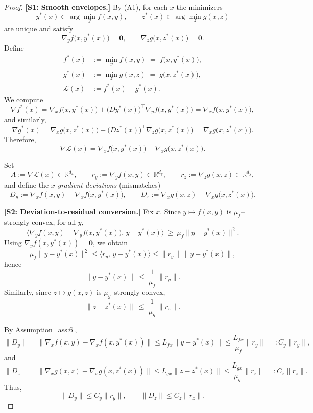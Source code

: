 \documentclass{article}
\newcommand{\1}{\mathbf{1}}
\begin{document}
\begin{proof}
\textbf{[S1: Smooth envelopes.]}
\noindent By \textnormal{(A1)}, for each $x$ the minimizers
\[
y^*(x)\in\arg\min_{y} f(x,y),\qquad z^*(x)\in\arg\min_{z} g(x,z)
\]
are unique and satisfy 
\[
\nabla_y f\bigl(x,y^*(x)\bigr)=\mathbf 0,
\qquad
\nabla_z g\bigl(x,z^*(x)\bigr)=\mathbf 0.
\]
Define
\[
\begin{aligned}
f^*(x) &:= \min_{y} f(x,y) \;=\; f\bigl(x,y^*(x)\bigr),\\
g^*(x) &:= \min_{z} g(x,z) \;=\; g\bigl(x,z^*(x)\bigr),\\
\mathcal L(x) &:= f^*(x) - g^*(x).
\end{aligned}
\]
We compute
\[
\nabla f^*(x)
=\nabla_x f\bigl(x,y^*(x)\bigr)
+\bigl(Dy^*(x)\bigr)^{\top}\nabla_y f\bigl(x,y^*(x)\bigr)
=\nabla_x f\bigl(x,y^*(x)\bigr),
\]
and similarly,
\[
\nabla g^*(x)
=\nabla_x g\bigl(x,z^*(x)\bigr)
+\bigl(Dz^*(x)\bigr)^{\top}\nabla_z g\bigl(x,z^*(x)\bigr)
=\nabla_x g\bigl(x,z^*(x)\bigr).
\]
Therefore,
\begin{equation}\label{eq:L-grad}
\nabla \mathcal L(x)=\nabla_x f\bigl(x,y^*(x)\bigr)-\nabla_x g\bigl(x,z^*(x)\bigr).
\end{equation}

\smallskip
\noindent Set
\[
A:=\nabla \mathcal L(x)\in\mathbb R^{d_x},
\qquad
r_y:=\nabla_y f(x,y)\in\mathbb R^{d_y},
\qquad
r_z:=\nabla_z g(x,z)\in\mathbb R^{d_y},
\]
and define the \emph{$x$-gradient deviations} (mismatches)
\[
D_y:=\nabla_x f(x,y)-\nabla_x f\bigl(x,y^*(x)\bigr),
\qquad
D_z:=\nabla_x g(x,z)-\nabla_x g\bigl(x,z^*(x)\bigr).
\]

\medskip
\textbf{[S2: Deviation-to-residual conversion.]}
\noindent Fix $x$. Since $y\mapsto f(x,y)$ is $\mu_f$--strongly convex, for all $y$,
\[
\big\langle \nabla_y f(x,y)-\nabla_y f\bigl(x,y^*(x)\bigr),\,y-y^*(x)\big\rangle
\ \ge\ \mu_f\|y-y^*(x)\|^2.
\]
Using $\nabla_y f(x,y^*(x))=\mathbf 0$, we obtain
\[
\mu_f\|y-y^*(x)\|^2\le \langle r_y,\,y-y^*(x)\rangle
\le \|r_y\|\,\|y-y^*(x)\|,
\]
hence
\begin{equation}\label{eq:track-y}
\|y-y^*(x)\|\ \le\ \frac{1}{\mu_f}\,\|r_y\|.
\end{equation}
Similarly, since $z\mapsto g(x,z)$ is $\mu_g$--strongly convex,
\begin{equation}\label{eq:track-z}
\|z-z^*(x)\|\ \le\ \frac{1}{\mu_g}\,\|r_z\|.
\end{equation}

\smallskip
\noindent By Assumption~\ref{ass:6},
\[
\|D_y\|
=\bigl\|\nabla_x f(x,y)-\nabla_x f(x,y^*(x))\bigr\|
\le L_{fx}\|y-y^*(x)\|
\le \frac{L_{fx}}{\mu_f}\|r_y\|
=:C_y\|r_y\|,
\]
and
\[
\|D_z\|
=\bigl\|\nabla_x g(x,z)-\nabla_x g(x,z^*(x))\bigr\|
\le L_{gx}\|z-z^*(x)\|
\le \frac{L_{gx}}{\mu_g}\|r_z\|
=:C_z\|r_z\|.
\]
Thus,
\begin{equation}\label{eq:DyDz-bound}
\|D_y\|\le C_y\|r_y\|,
\qquad
\|D_z\|\le C_z\|r_z\|.
\end{equation}


\end{proof}
\end{document}
